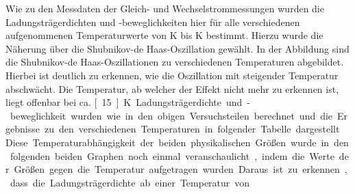 

Wie zu den Messdaten der Gleich- und Wechselstrommessungen wurden die Ladungsträgerdichten und -beweglichkeiten hier für alle verschiedenen aufgenommenen Temperaturwerte von \unit[2]{K} bis \unit[40]{K} bestimmt. Hierzu wurde die Näherung über die Shubnikov-de Haas-Oszillation gewählt. %
In der Abbildung %
sind die Shubnikov-de Haas-Oszillationen zu verschiedenen Temperaturen abgebildet. Hierbei ist deutlich zu erkennen, wie die Oszillation mit steigender Temperatur abschwächt. Die Temperatur, ab welcher der Effekt nicht mehr zu erkennen ist, liegt offenbar bei ca. \unit
[15]{K}.%
Ladungsträgerdichte und -beweglichkeit wurden wie in den obigen Versuchsteilen berechnet und die Ergebnisse zu den verschiedenen Temperaturen in folgender Tabelle dargestellt. %
Diese Temperaturabhängigkeit der beiden physikalischen Größen wurde in den folgenden beiden Graphen noch einmal veranschaulicht, indem die Werte der Größen gegen die Temperatur aufgetragen wurden. %
Daraus ist zu erkennen, dass die Ladungsträgerdichte ab einer Temperatur von %



